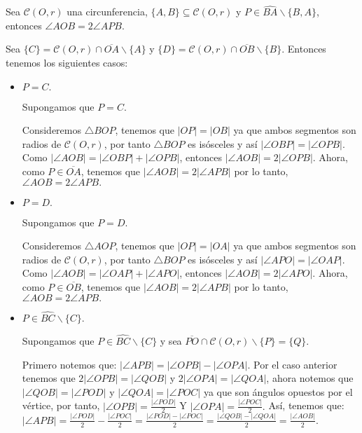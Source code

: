 \begin{prop}\label{P1AIC}
Sea $\mathcal{C}(O,r)$ una circunferencia, $\{A,B\}\subseteq\mathcal{C}(O,r)$ y $P\in\widehat{BA}\backslash\{B, A\}$, entonces $\angle AOB=2\angle APB.$
\end{prop}
\begin{pba}
Sea $\{C\}=\mathcal{C}(O,r)\cap\overline{OA}\backslash\{A\}$ y $\{D\}=\mathcal{C}(O,r)\cap\overline{OB}\backslash\{B\}.$ Entonces tenemos los siguientes casos:

\begin{itemize}
\item $P=C.$

Supongamos que $P=C.$

Consideremos $\triangle BOP$, tenemos que $|OP|=|OB|$ ya que ambos segmentos son radios de $\mathcal{C}(O,r)$, por tanto $\triangle BOP$ es isósceles y así $|\angle OBP|=|\angle OPB|$. Como $|\angle AOB|=|\angle OBP|+|\angle OPB|$, entonces $|\angle AOB|=2|\angle OPB|.$ Ahora, como $P\in\overline{OA}$, tenemos que $|\angle AOB|=2|\angle APB|$ por lo tanto, $\angle AOB=2\angle APB.$

\item $P=D.$

Supongamos que $P=D.$

Consideremos $\triangle AOP$, tenemos que $|OP|=|OA|$ ya que ambos segmentos son radios de $\mathcal{C}(O,r)$, por tanto $\triangle BOP$ es isósceles y así $|\angle APO|=|\angle OAP|$. Como $|\angle AOB|=|\angle OAP|+|\angle APO|$, entonces $|\angle AOB|=2|\angle APO|.$ Ahora, como $P\in\overline{OB}$, tenemos que $|\angle AOB|=2|\angle APB|$ por lo tanto, $\angle AOB=2\angle APB.$
\item $P\in\widehat{BC}\backslash\{C\}.$

Supongamos que $P\in\widehat{BC}\backslash\{C\}$ y sea $\overline{PO}\cap\mathcal{C}(O,r)\backslash\{P\}=\{Q\}.$

Primero notemos que: $|\angle APB|=|\angle OPB|-|\angle OPA|.$ Por el caso anterior tenemos que $2|\angle OPB|=|\angle QOB|$ y $2|\angle OPA|=|\angle QOA|$, ahora notemos que $|\angle QOB|=|\angle POD|$ y $|\angle QOA|=|\angle POC|$ ya que son ángulos  opuestos por el vértice, por tanto, $|\angle OPB|=\frac{|\angle POD|}{2}$ Y $|\angle OPA|=\frac{|\angle POC|}{2}.$ Así, tenemos que: $|\angle APB|=\frac{|\angle POD|}{2}-\frac{|\angle POC|}{2}=\frac{|\angle POD|-|\angle POC|}{2}=\frac{|\angle QOB|-|\angle QOA|}{2}=\frac{|\angle AOB|}{2}.$ 


\end{itemize}
\end{pba}
